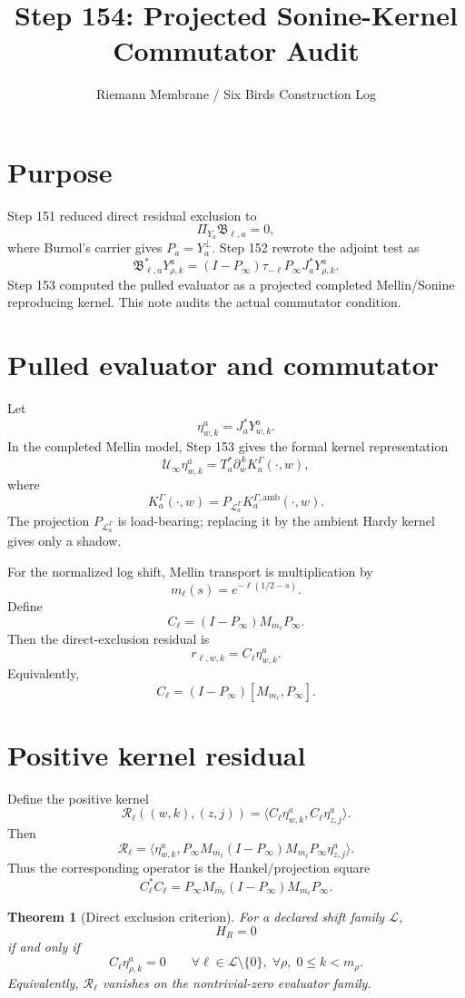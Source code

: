 \documentclass[11pt]{article}
\title{Step 154: Projected Sonine-Kernel Commutator Audit}
\author{Riemann Membrane / Six Birds Construction Log}
\date{}
\newtheorem{theorem}{Theorem}
\begin{document}
\maketitle

\section{Purpose}
Step 151 reduced direct residual exclusion to
\[
  \Pi_{Y_a}\mathfrak B_{\ell,a}=0,
\]
where Burnol's carrier gives \(P_a=Y_a^\perp\).  Step 152 rewrote the adjoint test as
\[
  \mathfrak B_{\ell,a}^*Y^a_{\rho,k}
  =(I-P_\infty)\tau_{-\ell}P_\infty J_a^*Y^a_{\rho,k}.
\]
Step 153 computed the pulled evaluator as a projected completed Mellin/Sonine reproducing kernel.
This note audits the actual commutator condition.

\section{Pulled evaluator and commutator}
Let
\[
  \eta^a_{w,k}=J_a^*Y^a_{w,k}.
\]
In the completed Mellin model, Step 153 gives the formal kernel representation
\[
  \mathcal U_\infty\eta^a_{w,k}
  = T_a^*\partial_{\bar w}^{\,k}K_a^\Gamma(\cdot,w),
\]
where
\[
  K_a^\Gamma(\cdot,w)=P_{\mathcal L_a^\Gamma}K_a^{\Gamma,\mathrm{amb}}(\cdot,w).
\]
The projection \(P_{\mathcal L_a^\Gamma}\) is load-bearing; replacing it by the ambient Hardy kernel gives only a shadow.

For the normalized log shift, Mellin transport is multiplication by
\[
  m_\ell(s)=e^{-\ell(1/2-s)}.
\]
Define
\[
  C_\ell=(I-P_\infty)M_{m_\ell}P_\infty.
\]
Then the direct-exclusion residual is
\[
  r_{\ell,w,k}=C_\ell\eta^a_{w,k}.
\]
Equivalently,
\[
  C_\ell=(I-P_\infty)[M_{m_\ell},P_\infty].
\]

\section{Positive kernel residual}
Define the positive kernel
\[
  \mathcal R_\ell((w,k),(z,j))
  =\langle C_\ell\eta^a_{w,k},C_\ell\eta^a_{z,j}\rangle.
\]
Then
\[
  \mathcal R_\ell
  = \langle \eta^a_{w,k},
      P_\infty M_{\overline{m_\ell}}(I-P_\infty)M_{m_\ell}P_\infty
      \eta^a_{z,j}\rangle.
\]
Thus the corresponding operator is the Hankel/projection square
\[
  C_\ell^*C_\ell
  =P_\infty M_{\overline{m_\ell}}(I-P_\infty)M_{m_\ell}P_\infty.
\]

\begin{theorem}[Direct exclusion criterion]
For a declared shift family \(\mathcal L\),
\[
  H_R=0
\]
if and only if
\[
  C_\ell\eta^a_{\rho,k}=0
  \qquad
  \forall \ell\in\mathcal L\setminus\{0\},\; \forall \rho,\;0\le k<m_\rho.
\]
Equivalently, \(\mathcal R_\ell\) vanishes on the nontrivial-zero evaluator family.
\end{theorem}
\end{document}
